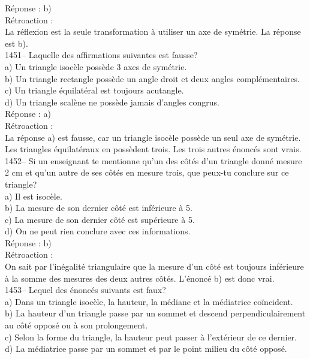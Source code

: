 R\'eponse : b)\\

R\'etroaction :\\
La r\'eflexion est la seule transformation \`a utiliser un axe de
sym\'etrie. La r\'eponse est b).\\

1451-- Laquelle des affirmations suivantes est fausse?\\
a) Un triangle isoc\`ele poss\`ede 3 axes de sym\'etrie.\\
b) Un triangle rectangle poss\`ede un angle droit et deux angles
compl\'ementaires.\\
c) Un triangle \'equilat\'eral est toujours acutangle.\\
d) Un triangle scal\`ene ne poss\`ede jamais d'angles congrus.\\

R\'eponse : a)\\

R\'etroaction :\\
La r\'eponse a) est fausse, car un triangle isoc\`ele poss\`ede un seul axe
de sym\'etrie. Les triangles \'equilat\'eraux en poss\`edent trois. Les
trois autres \'enonc\'es sont vrais.\\

1452-- Si un enseignant te mentionne qu'un des c\^ot\'es d'un triangle
donn\'e mesure 2 cm et qu'un autre de ses c\^ot\'es en mesure trois,
que
peux-tu conclure sur ce triangle?\\
a) Il est isoc\`ele.\\
b) La mesure de son dernier c\^ot\'e est inf\'erieure \`a 5.\\
c) La mesure de son dernier c\^ot\'e est sup\'erieure \`a 5.\\
d) On ne peut rien conclure avec ces informations.\\

R\'eponse : b)\\

R\'etroaction :\\
On sait par l'in\'egalit\'e triangulaire que la mesure d'un c\^ot\'e
est toujours inf\'erieure \`a la somme des mesures des deux autres
c\^ot\'es. L'\'enonc\'e b) est donc
vrai.\\

1453-- Lequel des \'enonc\'es suivants est faux?\\
a) Dans un triangle isoc\`ele, la hauteur, la m\'ediane et la
m\'ediatrice co\"incident.\\
b) La hauteur d'un triangle passe par un sommet et descend
perpendiculairement
au c\^ot\'e oppos\'e ou \`a son prolongement.\\
c) Selon la forme du triangle, la hauteur peut passer \`a
l'ext\'erieur de ce dernier.\\
d) La m\'ediatrice passe par un sommet et par le point milieu du
c\^ot\'e
oppos\'e.\\

